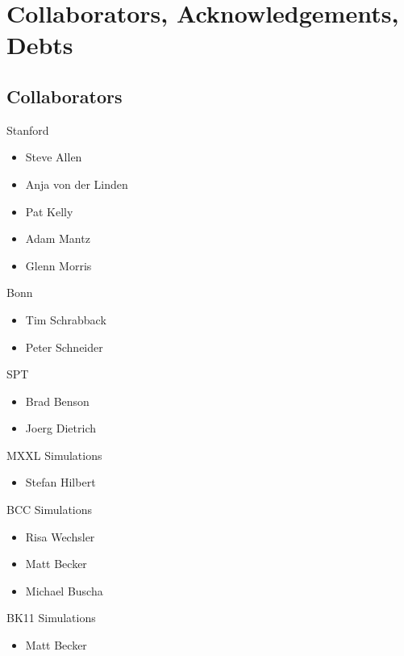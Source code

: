 \documentclass[11pt]{article}
\begin{document}
\clearpage \newpage

\section{Collaborators, Acknowledgements, Debts}

\subsection{Collaborators}

Stanford
\begin{itemize}
\item Steve Allen
\item Anja von der Linden
\item Pat Kelly
\item Adam Mantz
\item Glenn Morris
\end{itemize}

Bonn
\begin{itemize}
\item Tim Schrabback
\item Peter Schneider
\end{itemize}

SPT
\begin{itemize}
\item Brad Benson
\item Joerg Dietrich
\end{itemize}

MXXL Simulations
\begin{itemize}
\item Stefan Hilbert
\end{itemize}

BCC Simulations
\begin{itemize}
\item Risa Wechsler
\item Matt Becker
\item Michael Buscha
\end{itemize}

BK11 Simulations
\begin{itemize}
\item Matt Becker
\end{itemize}





\end{document}
